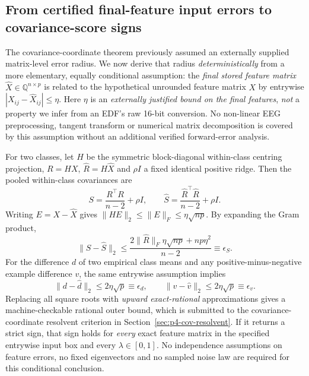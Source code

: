 \subsection{From certified final-feature input errors to covariance-score signs}
\label{sec:p4-final-feature-chain}
The covariance-coordinate theorem previously assumed
an externally supplied matrix-level error radius.
We now derive that radius \emph{deterministically}
from a more elementary, equally conditional assumption:
the \emph{final stored feature matrix} $\widehat X\in
\mathbb Q^{n\times p}$ is related to the hypothetical
unrounded feature matrix $X$ by entrywise
$|X_{ij}-\widehat X_{ij}|\leq\eta$.
Here $\eta$ is an \emph{externally justified bound
on the final features}, \emph{not} a property we
infer from an EDF's raw 16-bit conversion.
No non-linear EEG preprocessing, tangent transform
or numerical matrix decomposition is covered by
this assumption without an additional verified
forward-error analysis.

For two classes, let $H$ be the symmetric
block-diagonal within-class centring projection,
$R=HX$, $\widehat R=H\widehat X$ and
$\rho I$ a fixed identical positive ridge.
Then the pooled within-class covariances are
\[
S=\frac{R^\top R}{n-2}+\rho I,\qquad
\widehat S=\frac{\widehat R^\top\widehat R}{n-2}+\rho I.
\]
Writing $E=X-\widehat X$ gives
$\|HE\|_2\leq\|E\|_F\leq\eta\sqrt{np}$.
By expanding the Gram product,
\[
\|S-\widehat S\|_2\leq
\frac{2\|\widehat R\|_F\eta\sqrt{np}
       +np\eta^2}{n-2}
\equiv\epsilon_S.
\]
For the difference $d$ of two empirical class
means and any positive-minus-negative example
difference $v$, the same entrywise assumption
implies
\[
\|d-\widehat d\|_2\leq 2\eta\sqrt{p}
\equiv\epsilon_d,\qquad
\|v-\widehat v\|_2\leq 2\eta\sqrt{p}
\equiv\epsilon_v.
\]
Replacing all square roots with \emph{upward exact-rational}
approximations gives a machine-checkable rational
outer bound, which is submitted to the
covariance-coordinate resolvent criterion in
Section~\ref{sec:p4-cov-resolvent}.
If it returns a strict sign, that sign holds for
\emph{every} exact feature matrix in the specified
entrywise input box and every $\lambda\in[0,1]$.
No independence assumptions on feature errors,
no fixed eigenvectors and no sampled noise law
are required for this conditional conclusion.

